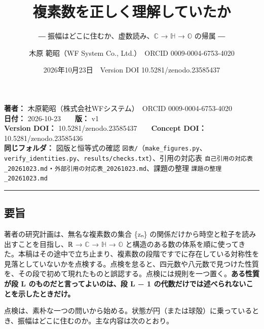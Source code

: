 \documentclass[
  a4paper,
]{ltjsarticle}
\title{複素数を正しく理解していたか}
\subtitle{― 振幅はどこに住むか、虚数読み、\(\mathbb{C}\) →
\(\mathbb{H}\) → \(\mathbb{O}\) の帰属 ―}
\author{木原 範昭（WF System Co., Ltd.）　ORCID 0009-0004-6753-4020}
\date{2026年10月23日　Version DOI 10.5281/zenodo.23585437}
\begin{document}
\maketitle

\textbf{著者：} 木原範昭（株式会社WFシステム）　ORCID
0009-0004-6753-4020\\
\textbf{日付：} 2026-10-23　　\textbf{版：} v1\\
\textbf{Version DOI：} 10.5281/zenodo.23585437　　\textbf{Concept DOI：}
10.5281/zenodo.23585436\\
\textbf{同じフォルダ：} 図版と恒等式の確認
\texttt{図表/\allowbreak{}}（\texttt{make\_\allowbreak{}figures.py}、\texttt{verify\_\allowbreak{}identities.py}、\texttt{results/\allowbreak{}checks.txt}）、引用の対応表
\texttt{自己引用の対応表\_\allowbreak{}20261023.md}・\texttt{外部引用の対応表\_\allowbreak{}20261023.md}、課題の整理
\texttt{課題の整理\_\allowbreak{}20261023.md}

\begin{center}\rule{0.5\linewidth}{0.5pt}\end{center}

\subsection{要旨}\label{ux8981ux65e8}

著者の研究計画は、無名な複素数の集合 \{zₙ\}
の関係だけから時空と粒子を読み出すことを目指し、ℝ → \(\mathbb{C}\) →
\(\mathbb{H}\) → \(\mathbb{O}\)
と構造のある数の体系を順に使ってきた。本稿はその途中で立ち止まり、複素数の段階ですでに存在している対称性を見落としていないかを点検する。点検を怠ると、四元数や八元数で見つけた性質を、その段で初めて現れたものと誤認する。点検には規則を一つ置く。\textbf{ある性質が段
L のものだと言ってよいのは、段 L − 1
の代数だけでは述べられないことを示したときだけ。}

点検は、素朴な一つの問いから始める。状態が円（または球殻）に乗っているとき、振幅はどこに住むのか。主な内容は次のとおり。
\end{document}
